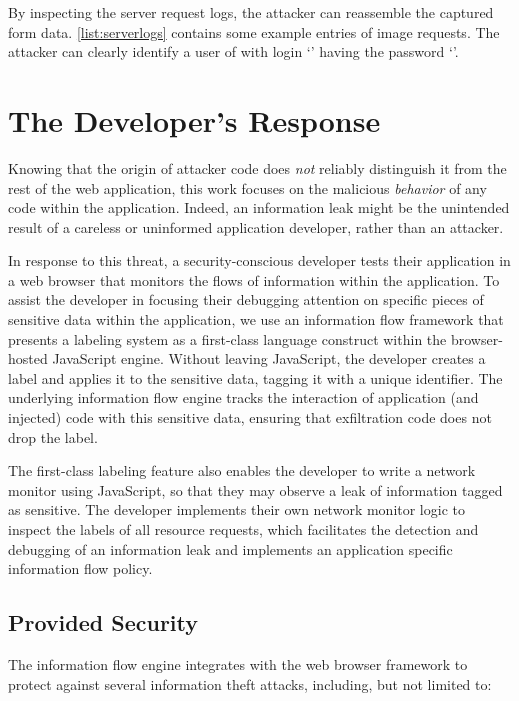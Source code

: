 By inspecting the server request logs, the attacker can reassemble the captured form data.
\autoref{list:serverlogs} contains some example entries of image requests.
The attacker can clearly identify a user of  with login `' having the password `'.

\section{The Developer's Response}\label{sec:developers-response}

Knowing that the origin of attacker code does \emph{not} reliably distinguish it from the rest of the web application, this work focuses on the malicious \emph{behavior} of any code within the application.
Indeed, an information leak might be the unintended result of a careless or uninformed application developer, rather than an attacker.

In response to this threat, a security-conscious developer tests their application in a web browser that monitors the flows of information within the application.
To assist the developer in focusing their debugging attention on specific pieces of sensitive data within the application, we use an information flow framework that presents a labeling system as a first-class language construct within the browser-hosted JavaScript engine.
Without leaving JavaScript, the developer creates a label and applies it to the sensitive data, tagging it with a unique identifier.
The underlying information flow engine tracks the interaction of application (and injected) code with this sensitive data, ensuring that exfiltration code does not drop the label.

The first-class labeling feature also enables the developer to write a network monitor using JavaScript, so that they may observe a leak of information tagged as sensitive.
The developer implements their own network monitor logic to inspect the labels of all resource requests, which facilitates the detection and debugging of an information leak and implements an application specific information flow policy.

\subsection{Provided Security}\label{sec:defense-providedsecurity}

The information flow engine integrates with the web browser framework to protect against several information theft attacks, including, but not limited to:

